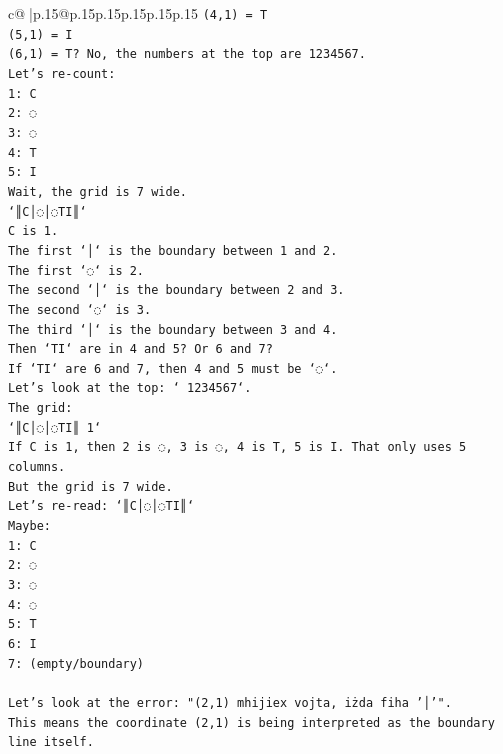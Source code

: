 \documentclass{article}
\begin{document}
{\begin{supertabular}{c@{$\;$}|p{.15\linewidth}@{}p{.15\linewidth}p{.15\linewidth}p{.15\linewidth}p{.15\linewidth}p{.15\linewidth}}
{{{\texttt{(4,1) = T} \\
\texttt{(5,1) = I} \\
\texttt{(6,1) = T? No, the numbers at the top are 1234567.} \\
\texttt{Let's re{-}count:} \\
\texttt{1: C} \\
\texttt{2: ◌} \\
\texttt{3: ◌} \\
\texttt{4: T} \\
\texttt{5: I} \\
\texttt{Wait, the grid is 7 wide.} \\
\texttt{`║C│◌│◌TI║`} \\
\texttt{C is 1.} \\
\texttt{The first `│` is the boundary between 1 and 2.} \\
\texttt{The first `◌` is 2.} \\
\texttt{The second `│` is the boundary between 2 and 3.} \\
\texttt{The second `◌` is 3.} \\
\texttt{The third `│` is the boundary between 3 and 4.} \\
\texttt{Then `TI` are in 4 and 5? Or 6 and 7?} \\
\texttt{If `TI` are 6 and 7, then 4 and 5 must be `◌`.} \\
\texttt{Let's look at the top: ` 1234567`.} \\
\texttt{The grid:} \\
\texttt{`║C│◌│◌TI║ 1`} \\
\texttt{If C is 1, then 2 is ◌, 3 is ◌, 4 is T, 5 is I. That only uses 5 columns.} \\
\texttt{But the grid is 7 wide.} \\
\texttt{Let's re{-}read: `║C│◌│◌TI║`} \\
\texttt{Maybe:} \\
\texttt{1: C} \\
\texttt{2: ◌} \\
\texttt{3: ◌} \\
\texttt{4: ◌} \\
\texttt{5: T} \\
\texttt{6: I} \\
\texttt{7: (empty/boundary)} \\
\\ 
\texttt{Let's look at the error: "(2,1) mhijiex vojta, iżda fiha '│'".} \\
\texttt{This means the coordinate (2,1) is being interpreted as the boundary line itself.} \\
}}}
\end{supertabular}}
\end{document}
